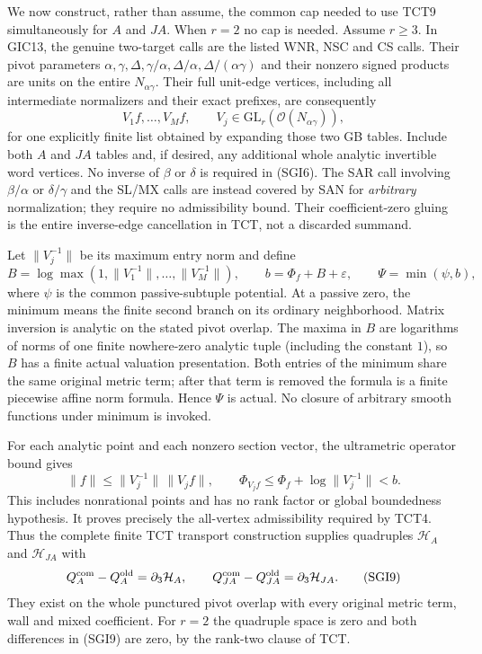 We now construct, rather than assume, the common cap needed to use
TCT9 simultaneously for $A$ and $JA$.  When $r=2$ no cap is needed.
Assume $r\ge3$.  In GIC13, the genuine two-target calls are the
listed WNR, NSC and CS calls.  Their pivot parameters
$\alpha,\gamma,\Delta,\gamma/\alpha,\Delta/\alpha,
\Delta/(\alpha\gamma)$ and their nonzero signed products are units
on the entire $N_{\alpha\gamma}$.  Their full unit-edge vertices,
including all intermediate normalizers and their exact prefixes,
are consequently
\[
                    V_1f,\ldots,V_Mf,
       \qquad V_j\in\mathrm{GL}_r(\mathcal O(N_{\alpha\gamma})),
 \tag{SGI6}
\]
for one explicitly finite list obtained by expanding those two GB
tables.  Include both $A$ and $JA$ tables and, if desired, any
additional whole analytic invertible word vertices.  No inverse of
$\beta$ or $\delta$ is required in (SGI6).  The SAR call involving
$\beta/\alpha$ or $\delta/\gamma$ and the SL/MX calls are instead
covered by SAN for \emph{arbitrary} normalization; they require no
admissibility bound.  Their coefficient-zero gluing is the entire
inverse-edge cancellation in TCT, not a discarded summand.

Let $\|V_j^{-1}\|$ be its maximum entry norm and define
\[
 B=\log\max(1,\|V_1^{-1}\|,\ldots,\|V_M^{-1}\|),
 \qquad b=\Phi_f+B+\varepsilon,
 \qquad \Psi=\min(\psi,b),
 \tag{SGI7}
\]
where $\psi$ is the common passive-subtuple potential.  At a
passive zero, the minimum means the finite second branch on its
ordinary neighborhood.  Matrix inversion is analytic on the stated
pivot overlap.  The maxima in $B$ are logarithms of norms of one
finite nowhere-zero analytic tuple (including the constant $1$),
so $B$ has a finite actual valuation presentation.  Both entries
of the minimum share the same original metric term; after that
term is removed the formula is a finite piecewise affine norm
formula.  Hence $\Psi$ is actual.  No closure of arbitrary smooth
functions under minimum is invoked.

For each analytic point and each nonzero section vector, the
ultrametric operator bound gives
\[
 \|f\|\le\|V_j^{-1}\|\,\|V_jf\|,
 \qquad \Phi_{V_jf}\le\Phi_f+\log\|V_j^{-1}\|<b.
 \tag{SGI8}
\]
This includes nonrational points and has no rank factor or global
boundedness hypothesis.  It proves precisely the all-vertex
admissibility required by TCT4.  Thus the complete finite TCT
transport construction supplies quadruples $\mathcal H_A$ and
$\mathcal H_{JA}$ with
\[
 Q_A^{\rm com}-Q_A^{\rm old}=\partial_3\mathcal H_A,
 \qquad Q_{JA}^{\rm com}-Q_{JA}^{\rm old}
                                    =\partial_3\mathcal H_{JA}.
 \tag{SGI9}
\]
They exist on the whole punctured pivot overlap with every original
metric term, wall and mixed coefficient.  For $r=2$ the quadruple
space is zero and both differences in (SGI9) are zero, by the
rank-two clause of TCT.

